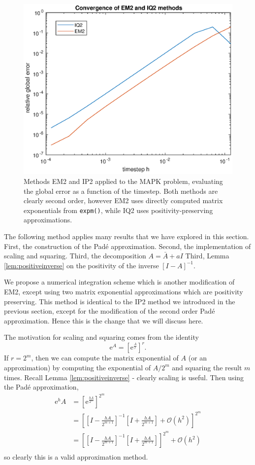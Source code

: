 \begin{figure}
    \centering
    \includegraphics[width=0.75\linewidth]{Matlab/positivemapk.eps}
    \caption{
        Methods EM2 and IP2 applied to the MAPK problem, evaluating the global error as a function of the timestep.
        Both methods are clearly second order, however EM2 uses directly computed matrix exponentials from \texttt{expm()},
        while IQ2 uses positivity-preserving approximations.
    }
    \label{fig:pademapkpos}
\end{figure}

The following method applies many results that we have explored in this section.
First, the construction of the Pad\'e approximation.
Second, the implementation of scaling and squaring.
Third, the decomposition $A = \bar{A} + a I$
Third, Lemma \ref{lem:positiveinverse} on the positivity of the inverse $[I - A]^{-1}$.

We propose a numerical integration scheme which is another modification of EM2, except using two matrix exponential approximations which are positivity preserving.
This method is identical to the IP2 method we introduced in the previous section, except for the modification of the second order Pad\'e approximation.
Hence this is the change that we will discuss here.

The motivation for scaling and squaring comes from the identity 
\begin{equation*}
    \mathrm{e}^A = \left[ \mathrm{e}^\frac{A}{r} \right]^r.
\end{equation*}
If $r = 2^m$, then we can compute the matrix exponential of $A$ (or an approximation) by computing the exponential of $A/2^m$ and squaring the result $m$ times.
Recall Lemma \ref{lem:positiveinverse} - clearly scaling is useful.
Then using the Pad\'e approximation,
\begin{align*}
    \mathrm{e}^hA &= \left[ \mathrm{e}^\frac{hA}{2^m} \right]^{2^m} \\
    &= \left[
        \left[ I - \frac{hA}{2^{m+1}} \right]^{-1} \left[ I + \frac{hA}{2^{m+1}} \right] + \mathcal{O}(h^2)
    \right]^{2^m} \\
    &= \left[
        \left[ I - \frac{hA}{2^{m+1}} \right]^{-1} \left[ I + \frac{hA}{2^{m+1}} \right]
    \right]^{2^m} + \mathcal{O}(h^2) \\
\end{align*} 
so clearly this is a valid approximation method.

